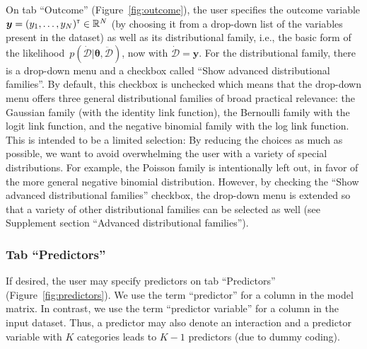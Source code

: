 On tab ``Outcome'' (Figure~\ref{fig:outcome}), the user specifies the
outcome variable $\boldsymbol{y} = (y_1, \dotsc, y_N)^{\scriptscriptstyle \mathsf{T}} \in \mathbb{R}^N$ (by
choosing it from a drop-down list of the variables present in the dataset) as
well as its distributional family, i.e., the basic form of the
likelihood~$p(\boldsymbol{\dot{\mathcal{D}}} | \boldsymbol{\theta}, \boldsymbol{\ddot{\mathcal{D}}})$,
now with $\boldsymbol{\dot{\mathcal{D}}} = \boldsymbol{y}$. For the distributional family, there is a
drop-down menu and a checkbox called ``Show advanced distributional families''.
By default, this checkbox is unchecked which means that the drop-down menu
offers three general distributional families of broad practical relevance:
the Gaussian family (with the identity link function), the Bernoulli family
with the logit link function, and the negative binomial family with the
log link function. This is intended to be a limited selection:
By reducing the choices as much as possible, we want to avoid
overwhelming the user with a variety of special distributions. For example,
the Poisson family is intentionally left out, in favor of the more general
negative binomial distribution. However, by checking the ``Show advanced
distributional families'' checkbox, the drop-down menu is extended so that
a variety of other distributional families can be selected as well (see
Supplement section ``Advanced distributional families'').

\subsubsection[Tab "Predictors"]{Tab ``Predictors''}
\label{tab-pred}

If desired, the user may specify predictors on tab ``Predictors''
(Figure~\ref{fig:predictors}). We use the term
``predictor'' for a column in the model matrix. In contrast, we use the
term ``predictor variable'' for a column in the input dataset. Thus, a
predictor may also denote an interaction and a predictor
variable with $K$ categories leads to $K - 1$ predictors (due to dummy
coding).


